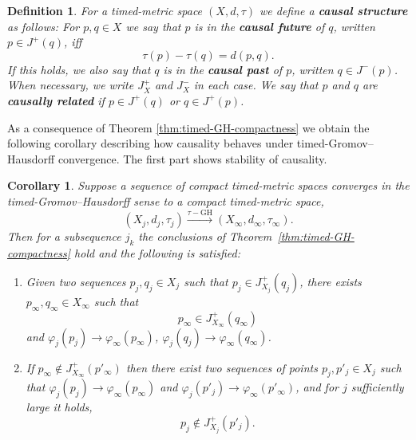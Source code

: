 \documentclass[a4paper,12pt,reqno]{amsart}
\theoremstyle{plain}
\newtheorem{cor}[thm]{Corollary}
\newtheorem{defn}[thm]{Definition}
\newcommand{\tGHto}{\stackrel { \tau-\textrm{GH}}{\longrightarrow} }
\newcommand{\be}{\begin{equation}}
\newcommand{\ee}{\end{equation}}
\begin{document}
\begin{defn}\label{defn:causal-structure}
For a timed-metric space $(X,d,\tau)$ we define a \textbf{causal structure} as follows: For $p,q \in X$ we say that $p$ is in the \textbf{causal future} of $q$, written  $p\in J^+(q)$, iff
\begin{equation}\label{def-causal-struc}
\tau(p)-\tau(q)=d(p,q).
\end{equation}
If this holds, we also say that $q$ is in the \textbf{causal past} of $p$,
written $q\in J^{-}(p)$. When necessary, we write $J^{+}_X$ and $J^{-}_X$ in each case. We say that $p$ and $q$ are \textbf{causally related} if 
$p\in J^+(q)$ or $q\in J^+(p)$.
\end{defn}

As a consequence of Theorem \ref{thm:timed-GH-compactness} we obtain the following corollary describing how causality behaves under timed-Gromov--Hausdorff convergence. The first part shows stability of causality. 


\begin{cor}\label{cor:CausalSeq}
Suppose a sequence of compact 
timed-metric spaces converges 
in the timed-Gromov--Hausdorff sense to a compact timed-metric space,
\be
(X_j,d_j,\tau_j)\tGHto
(X_\infty,d_\infty,\tau_\infty).
\ee
Then for a subsequence $j_k$
the conclusions of Theorem~\ref{thm:timed-GH-compactness}
hold and the following is satisfied:

\begin{enumerate}
\item\label{item:CausalSeq1} Given two sequences $p_j,q_j\in X_j$ such that 
$p_j\in J^+_{X_j}(q_j)$, there exists 
$p_\infty,q_\infty \in X_\infty$ such that
\be\label{eq-CausConv}
p_\infty\in J^+_{X_\infty}(q_\infty)
\ee
and $\varphi_j(p_j) \to \varphi_\infty(p_\infty)$, $\varphi_j(q_j) \to \varphi_\infty(q_\infty)$.
\item\label{item:CausalSeq2} If $p_\infty\notin J^+_{X_\infty}(p'_\infty)$
then there exist two sequences of points 
$p_j, p'_j \in X_j$ such that
$\varphi_j(p_j) \to \varphi_\infty(p_\infty)$ and 
$\varphi_j(p'_j) \to \varphi_\infty(p'_\infty)$, and for 
 $j$ sufficiently large it holds, 
\be
p_j\notin J^+_{X_j}(p'_j).
\ee
\end{enumerate}
\end{cor}
\end{document}
